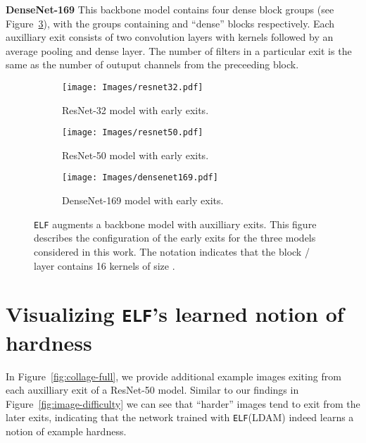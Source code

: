 \documentclass{article}
\newcommand{\method}{\texttt{ELF}\xspace}
\begin{document}
\textbf{DenseNet-169}  This backbone model contains four dense block groups (see Figure~\ref{subfig:densenet169_elf}), with the groups containing  and  ``dense'' blocks respectively. Each auxilliary exit consists of two convolution layers with  kernels followed by an average pooling and dense layer. 
The number of filters in a particular exit is the same as the number of outuput channels from the preceeding block.
 
 \vspace{3cm}
 
  \begin{figure}[t!]
     \centering
     \begin{subfigure}[b]{\textwidth}
         \centering
         \texttt{[image: Images/resnet32.pdf]}
         \caption{ResNet-32 model with early exits.  }
         \label{subfig:resnet32_elf}
         \vspace{1cm}
     \end{subfigure}
     
     \begin{subfigure}[b]{\textwidth}
         \centering
         \texttt{[image: Images/resnet50.pdf]}
         \caption{ResNet-50 model with early exits.}
         \label{subfig:resnet50_elf}
         \vspace{1cm}
     \end{subfigure}
     
     \begin{subfigure}[b]{\textwidth}
         \centering
         \texttt{[image: Images/densenet169.pdf]}
         \caption{DenseNet-169 model with early exits.}
         \label{subfig:densenet169_elf}
     \end{subfigure}
        \caption{\method{} augments a backbone model with auxilliary exits. This figure describes the configuration of the early exits for the three models considered in this work. 
        The notation  indicates that the block / layer contains 16 kernels of size .}
        \label{fig:elf_model_architectures}
\end{figure}
 


\section{Visualizing \method's learned notion of hardness}
In Figure~\ref{fig:collage-full}, we provide additional example images exiting from each auxilliary exit of a ResNet-50 model. Similar to our findings in Figure~\ref{fig:image-difficulty} we can see that ``harder'' images tend to exit from the later exits, indicating that the network trained with \method{}{\scriptsize (LDAM)} indeed learns a notion of example hardness.
\end{document}
